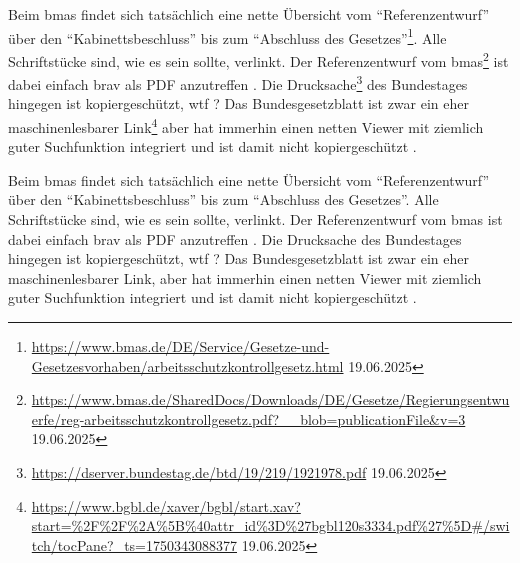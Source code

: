 Beim \gls{bmas} findet sich tatsächlich eine nette Übersicht vom \enquote{Referenzentwurf} über den \enquote{Kabinettsbeschluss} bis zum \enquote{Abschluss des Gesetzes}\footnote{
    \url{https://www.bmas.de/DE/Service/Gesetze-und-Gesetzesvorhaben/arbeitsschutzkontrollgesetz.html} 19.06.2025
}. 
Alle Schriftstücke sind, wie es sein sollte, verlinkt. Der Referenzentwurf vom \gls{bmas}\footnote{
    \url{https://www.bmas.de/SharedDocs/Downloads/DE/Gesetze/Regierungsentwuerfe/reg-arbeitsschutzkontrollgesetz.pdf?__blob=publicationFile&v=3} 19.06.2025
} ist dabei einfach brav als PDF anzutreffen \autocite{BMAS-21.07.2020}. 
Die Drucksache\footnote{
    \url{https://dserver.bundestag.de/btd/19/219/1921978.pdf} 19.06.2025
} des Bundestages hingegen ist kopiergeschützt, wtf \autocite{Bundestag.31.08.2020}?
Das Bundesgesetzblatt ist zwar ein eher maschinenlesbarer Link\footnote{
    \url{https://www.bgbl.de/xaver/bgbl/start.xav?start=%2F%2F%2A%5B%40attr_id%3D%27bgbl120s3334.pdf%27%5D#/switch/tocPane?_ts=1750343088377} 19.06.2025
} aber hat immerhin einen netten Viewer mit ziemlich guter Suchfunktion integriert und ist damit nicht kopiergeschützt \autocite{BGBl.2020-I-Nr67}. 


Beim \gls{bmas} findet sich tatsächlich eine nette Übersicht vom \enquote{Referenzentwurf} über den \enquote{Kabinettsbeschluss} bis zum \enquote{Abschluss des Gesetzes}.
Alle Schriftstücke sind, wie es sein sollte, verlinkt. Der Referenzentwurf vom \gls{bmas} ist dabei einfach brav als PDF anzutreffen \autocite{BMAS-21.07.2020}. 
Die Drucksache des Bundestages hingegen ist kopiergeschützt, wtf \autocite{Bundestag.31.08.2020}?
Das Bundesgesetzblatt ist zwar ein eher maschinenlesbarer Link, aber hat immerhin einen netten Viewer mit ziemlich guter Suchfunktion integriert und ist damit nicht kopiergeschützt \autocite{BGBl.2020-I-Nr67}. 


\newenvironment{myenumerate}
{ \begin{enumerate}
    \setlength{\itemsep}{0pt}
    \setlength{\parskip}{0pt}
    \setlength{\parsep}{0pt}     }
{ \end{enumerate}                } 


